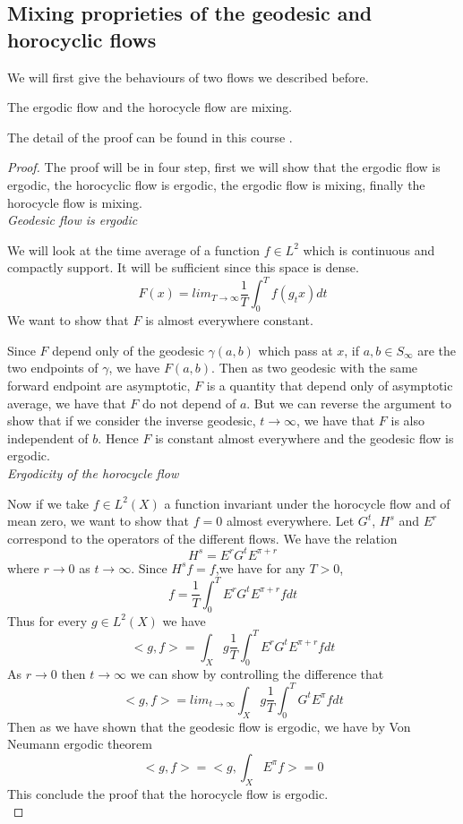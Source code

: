 \subsection{Mixing proprieties of the geodesic and horocyclic flows}

We will first give the behaviours of two flows we described before.

\begin{thm}
The ergodic flow and the horocycle flow are mixing.
\end{thm}
The detail of the proof can be found in this course \cite{Mcmullen1998HyperbolicM}.

\begin{proof}
The proof will be in four step, first we will show that the ergodic flow is ergodic, the horocyclic flow is ergodic, the ergodic flow is mixing, finally the horocycle flow is mixing.\\


\emph{Geodesic flow is ergodic}

We will look at the time average of a function $f \in L^2$ which is continuous and compactly support. It will be sufficient since this space is dense. \[
F(x) = lim_{T \to \infty} \frac{1}{T} \int_0^T f(g_t x)dt
\]
We want to show that $F$ is almost everywhere constant.

Since $F$ depend only of the geodesic $\gamma(a,b)$ which pass at $x$, if $a,b \in S_\infty$ are the two endpoints of $\gamma$, we have $F(a,b)$.
Then as two geodesic with the same forward endpoint are asymptotic, $F$ is a quantity that depend only of asymptotic average, we have that $F$ do not depend of $a$.
But we can reverse the argument to show that if we consider the inverse geodesic, $t \to \infty$, we have that $F$ is also independent of $b$. Hence $F$ is constant almost everywhere and the geodesic flow is ergodic.\\


\emph{Ergodicity of the horocycle flow}

Now if we take $f \in L^2(X)$ a function invariant under the horocycle flow and of mean zero, we want to show that $f=0$ almost everywhere.
Let $G^t$, $H^s$ and $E^r$ correspond to the operators of the different flows. We have the relation \[
H^s=E^r G^t E^{\pi+r}
\]
where $r \to 0$ as $t \to \infty$. Since $H^s f=f$,we have for any $T>0$,\[
f=\frac{1}{T} \int_0^T E^r G^t E^{\pi+r} f dt
\]
Thus for every $g \in L^2(X)$ we have \[
<g,f> = \int_X g \frac{1}{T} \int_0^T E^r G^t E^{\pi+r} f dt
\]
As $r \to 0$ then $t \to \infty$ we can show by controlling the difference that \[
<g,f> = lim_{t \to \infty} \int_X g \frac{1}{T} \int_0^T G^t E^{\pi} f dt
\]
Then as we have shown that the geodesic flow is ergodic, we have by Von Neumann ergodic theorem\[
<g,f> = <g,\int_X E^{\pi} f> =0
\]
This conclude the proof that the horocycle flow is ergodic.\\



\end{proof}
